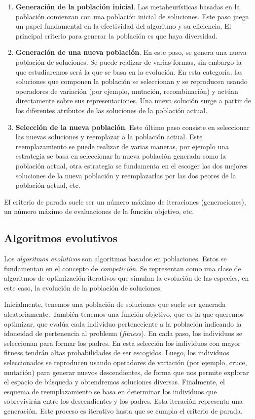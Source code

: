 \begin{enumerate}
    \item \textbf{Generación de la población inicial}. Las metaheurísticas basadas en la población comienzan con una población inicial de soluciones. Este paso juega un papel fundamental en la efectividad del algoritmo y su eficiencia. El principal criterio para generar la población es que haya diversidad.
    \item \textbf{Generación de una nueva población}. En este paso, se genera una nueva población de soluciones. Se puede realizar de varias formas, sin embargo la que estudiaremos será la que se basa en la evolución. En esta categoría, las soluciones que componen la población se seleccionan y se reproducen usando operadores de variación (por ejemplo, mutación, recombinación) y actúan directamente sobre sus representaciones. Una nueva solución surge a partir de los diferentes atributos de las soluciones de la población actual.
    \item \textbf{Selección de la nueva población}. Este último paso consiste en seleccionar las nuevas soluciones y reemplazar a la población actual. Este reemplazamiento se puede realizar de varias maneras, por ejemplo una estrategia se basa en seleccionar la nueva población generada como la población actual, otra estrategia se fundamenta en el escoger las dos mejores soluciones de la nueva población y reemplazarlas por las dos peores de la población actual, etc.
\end{enumerate}

El criterio de parada suele ser un número máximo de iteraciones (generaciones), un número máximo de evaluaciones de la función objetivo, etc.

\subsection{Algoritmos evolutivos}

Los \emph{algoritmos evolutivos} son algoritmos basados en poblaciones. Estos se fundamentan en el concepto de \emph{competición}. Se representan como una clase de algoritmos de optimización iterativos que simulan la evolución de las especies, en este caso, la evolución de la población de soluciones.

Inicialmente, tenemos una población de soluciones que suele ser generada aleatoriamente. También tenemos una función objetivo, que es la que queremos optimizar, que evalúa cada individuo perteneciente a la población indicando la idoneidad de pertenencia al problema (\emph{fitness}). En cada paso, los individuos se seleccionan para formar los padres. En esta selección los individuos con mayor fitness tendrán altas probabilidades de ser escogidos. Luego, los individuos seleccionados se reproducen usando operadores de variación (por ejemplo, cruce, mutación) para generar nuevos descendientes, de forma que nos permite explorar el espacio de búsqueda y obtendremos soluciones diversas. Finalmente, el esquema de reemplazamiento se basa en determinar los individuos que sobrevivirán entre los descendientes y los padres. Esta iteración representa una generación. Este proceso es iterativo hasta que se cumpla el criterio de parada.

